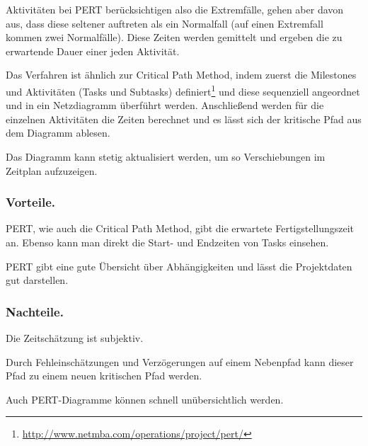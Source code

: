 		Aktivitäten bei PERT berücksichtigen also die Extremfälle, gehen aber davon aus, dass diese seltener auftreten als ein Normalfall (auf einen Extremfall kommen zwei Normalfälle).
		Diese Zeiten werden gemittelt und ergeben die zu erwartende Dauer einer jeden Aktivität.
		
		Das Verfahren ist ähnlich zur Critical Path Method, indem zuerst die Milestones und Aktivitäten (Tasks und Subtasks) definiert\footnote{
			\url{http://www.netmba.com/operations/project/pert/}
		} und diese sequenziell angeordnet und in ein Netzdiagramm überführt werden.
		Anschließend werden für die einzelnen Aktivitäten die Zeiten berechnet und es lässt sich der kritische Pfad aus dem Diagramm ablesen.
		
		Das Diagramm kann stetig aktualisiert werden, um so Verschiebungen im Zeitplan aufzuzeigen.
		
		\subsubsection{Vorteile.}
			\label{sssec:pert-pro}
			PERT, wie auch die Critical Path Method, gibt die erwartete Fertigstellungszeit an.
			Ebenso kann man direkt die Start- und Endzeiten von Tasks einsehen.
			
			PERT gibt eine gute Übersicht über Abhängigkeiten und lässt die Projektdaten gut darstellen.
			
		\subsubsection{Nachteile.}
			\label{sssec:pert-con}
			Die Zeitschätzung ist subjektiv.
			
			Durch Fehleinschätzungen und Verzögerungen auf einem Nebenpfad kann dieser Pfad zu einem neuen kritischen Pfad werden.
			
			Auch PERT-Diagramme können schnell unübersichtlich werden.
			

